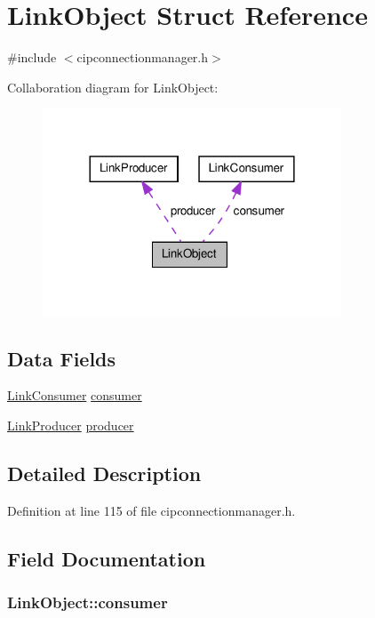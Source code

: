 \hypertarget{structLinkObject}{\section{\-Link\-Object \-Struct \-Reference}
\label{d7/d2d/structLinkObject}
}


{\ttfamily \#include $<$cipconnectionmanager.\-h$>$}



\-Collaboration diagram for \-Link\-Object\-:
\nopagebreak
\begin{figure}[H]
\begin{center}
\leavevmode
\includegraphics[width=252pt]{db/dc8/structLinkObject__coll__graph}
\end{center}
\end{figure}
\subsection*{\-Data \-Fields}
\begin{DoxyCompactItemize}
\item 
\hyperlink{structLinkConsumer}{\-Link\-Consumer} \hyperlink{structLinkObject_a629a746b0547e1e88095889f148fc636}{consumer}
\item 
\hyperlink{structLinkProducer}{\-Link\-Producer} \hyperlink{structLinkObject_a1fd25d4df3eeff06a5830eac14296bbb}{producer}
\end{DoxyCompactItemize}


\subsection{\-Detailed \-Description}


\-Definition at line 115 of file cipconnectionmanager.\-h.



\subsection{\-Field \-Documentation}
\hypertarget{structLinkObject_a629a746b0547e1e88095889f148fc636}{
\subsubsection[{consumer}]{ {\bf \-Link\-Object\-::consumer}}}\label{d7/d2d/structLinkObject_a629a746b0547e1e88095889f148fc636}


